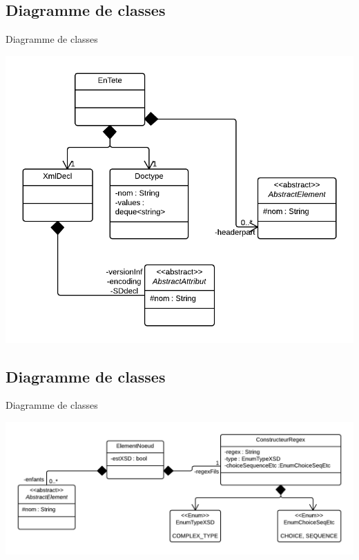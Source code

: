 \documentclass[aspectratio=169]{beamer}
\begin{document}
\subsection{Diagramme de classes}
\begin{frame}{Diagramme de classes}
\begin{center}
 \includegraphics[scale=0.3]{ddc_ent}
\end{center}
\end{frame}

\subsection{Diagramme de classes}
\begin{frame}{Diagramme de classes}
\begin{center}
  \includegraphics[scale=0.3]{ddc_noeud}
\end{center}
\end{frame}
\end{document}
